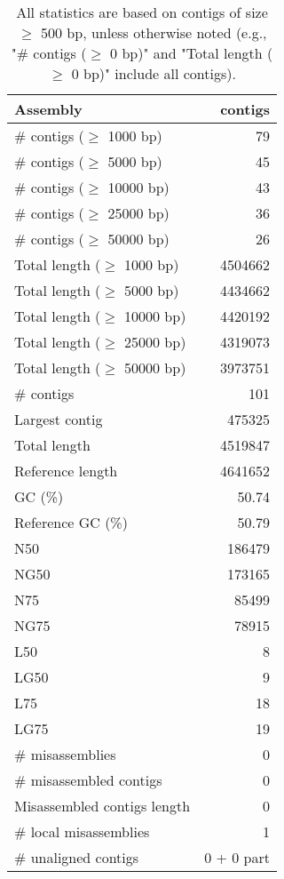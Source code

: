 \documentclass[12pt,a4paper]{article}
\begin{document}
\begin{table}[ht]
\begin{center}
\caption{All statistics are based on contigs of size $\geq$ 500 bp, unless otherwise noted (e.g., "\# contigs ($\geq$ 0 bp)" and "Total length ($\geq$ 0 bp)" include all contigs).}
\begin{tabular}{|l*{1}{|r}|}
\hline
Assembly & contigs \\ \hline
\# contigs ($\geq$ 1000 bp) & 79 \\ \hline
\# contigs ($\geq$ 5000 bp) & 45 \\ \hline
\# contigs ($\geq$ 10000 bp) & 43 \\ \hline
\# contigs ($\geq$ 25000 bp) & 36 \\ \hline
\# contigs ($\geq$ 50000 bp) & 26 \\ \hline
Total length ($\geq$ 1000 bp) & 4504662 \\ \hline
Total length ($\geq$ 5000 bp) & 4434662 \\ \hline
Total length ($\geq$ 10000 bp) & 4420192 \\ \hline
Total length ($\geq$ 25000 bp) & 4319073 \\ \hline
Total length ($\geq$ 50000 bp) & 3973751 \\ \hline
\# contigs & 101 \\ \hline
Largest contig & 475325 \\ \hline
Total length & 4519847 \\ \hline
Reference length & 4641652 \\ \hline
GC (\%) & 50.74 \\ \hline
Reference GC (\%) & 50.79 \\ \hline
N50 & 186479 \\ \hline
NG50 & 173165 \\ \hline
N75 & 85499 \\ \hline
NG75 & 78915 \\ \hline
L50 & 8 \\ \hline
LG50 & 9 \\ \hline
L75 & 18 \\ \hline
LG75 & 19 \\ \hline
\# misassemblies & 0 \\ \hline
\# misassembled contigs & 0 \\ \hline
Misassembled contigs length & 0 \\ \hline
\# local misassemblies & 1 \\ \hline
\# unaligned contigs & 0 + 0 part \\ \hline

\end{tabular}
\end{center}
\end{table}
\end{document}

